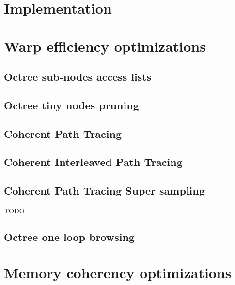 \documentclass[10pt,twocolumn,a4paper]{article}
\begin{document}
\section{Implementation}


\section{Warp efficiency optimizations}

\subsection{Octree sub-nodes access lists}


\subsection{Octree tiny nodes pruning}


\subsection{Coherent Path Tracing}


\subsection{Coherent Interleaved Path Tracing}


\subsection{Coherent Path Tracing Super sampling}
TODO

\subsection{Octree one loop browsing}



\section{Memory coherency optimizations}
\end{document}
